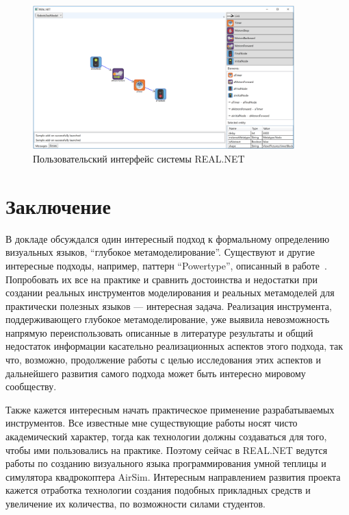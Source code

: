 \documentclass[a5paper]{article}
\begin{document}
\begin{figure}
	\begin{center}
		\includegraphics[width=0.9\textwidth]{realNet.png}
	\end{center}
	\caption{Пользовательский интерфейс системы REAL.NET}
	\label{figure:realNet}
\end{figure}

\section*{Заключение}

В докладе обсуждался один интересный подход к формальному определению визуальных языков, ``глубокое метамоделирование''. Существуют и другие интересные подходы, например, паттерн ``Powertype'', описанный в работе~\cite{gonzalez2006powertype}. Попробовать их все на практике и сравнить достоинства и недостатки при создании реальных инструментов моделирования и реальных метамоделей для практически полезных языков --- интересная задача. Реализация инструмента, поддерживающего глубокое метамоделирование, уже выявила невозможность напрямую переиспользовать описанные в литературе результаты и общий недостаток информации касательно реализационных аспектов этого подхода, так что, возможно, продолжение работы с целью исследования этих аспектов и дальнейшего развития самого подхода может быть интересно мировому сообществу.

Также кажется интересным начать практическое применение разрабатываемых инструментов. Все известные мне существующие работы носят чисто академический характер, тогда как технологии должны создаваться для того, чтобы ими пользовались на практике. Поэтому сейчас в REAL.NET ведутся работы по созданию визуального языка программирования умной теплицы и симулятора квадрокоптера AirSim. Интересным направлением развития проекта кажется отработка технологии создания подобных прикладных средств и увеличение их количества, по возможности силами студентов.



\end{document}
